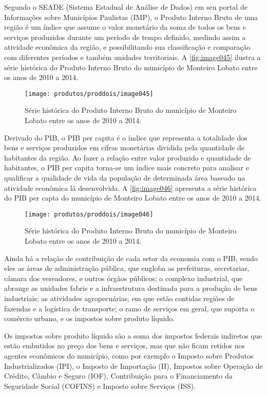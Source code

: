 Segundo o SEADE (Sistema Estadual de Análise de Dados) em seu portal de Informações sobre Municípios Paulistas (IMP), o Produto Interno Bruto de uma região é um índice que assume o valor monetário da soma de todos os bens e serviços produzidos durante um período de tempo definido, medindo assim a atividade econômica da região, e possibilitando sua classificação e comparação com diferentes períodos e também unidades territoriais. A \autoref{fig:image045} ilustra a série histórica do Produto Interno Bruto do município de Monteiro Lobato entre os anos de 2010 a 2014.

 \begin{figure}[h!]
	\centering
	\texttt{[image: produtos/proddois/image045]}
	\caption{Série histórica do Produto Interno Bruto do município de Monteiro Lobato entre os anos de 2010 a 2014.}
	\label{fig:image045}
\end{figure}

Derivado do PIB, o PIB per capita é o índice que representa a totalidade dos bens e serviços produzidos em cifras monetárias dividida pela quantidade de habitantes da região. Ao fazer a relação entre valor produzido e quantidade de habitantes, o PIB per capita torna-se um índice mais concreto para analisar e qualificar a qualidade de vida da população de determinada área baseado na atividade econômica lá desenvolvida. A \autoref{fig:image046} apresenta a série histórica do PIB per capta do município de Monteiro Lobato entre os anos de 2010 a 2014.

 \begin{figure}[h!]
	\centering
	\texttt{[image: produtos/proddois/image046]}
	\caption{Série histórica do Produto Interno Bruto do município de Monteiro Lobato entre os anos de 2010 a 2014.}
	\label{fig:image046}
\end{figure}

Ainda há a relação de contribuição de cada setor da economia com o PIB, sendo eles as áreas de administração pública, que engloba as prefeituras, secretarias, câmara dos vereadores, e outros órgãos públicos; o complexo industrial, que abrange as unidades fabris e a infraestrutura destinada para a produção de bens industriais; as atividades agropecuárias, em que estão contidas regiões de fazendas e a logística de transporte; o ramo de serviços em geral, que suporta o comércio urbano, e os impostos sobre produto líquido.

Os impostos sobre produto líquido são a soma dos impostos federais indiretos que estão embutidos no preço dos bens e serviços, mas que não ficam retidos nos agentes econômicos do município, como por exemplo o Imposto sobre Produtos Industrializados (IPI), o Imposto de Importação (II), Impostos sobre Operação de Crédito, Câmbio e Seguro (IOF), Contribuição para o Financiamento da Seguridade Social (COFINS) e Imposto sobre Serviços (ISS).

